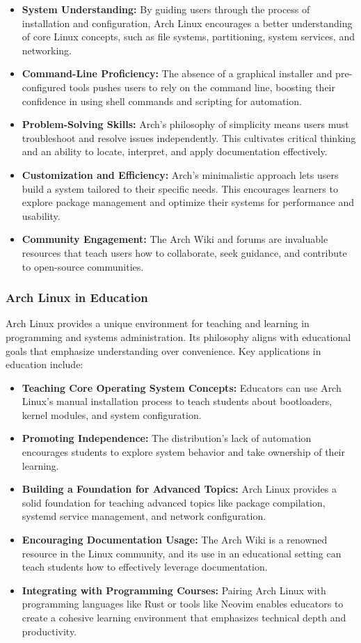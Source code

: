 \documentclass[12pt]{article}
\begin{document}
\begin{itemize}
    \item \textbf{System Understanding:} By guiding users through the process of installation and configuration, Arch Linux encourages a better understanding of core Linux concepts, such as file systems, partitioning, system services, and networking.
    \item \textbf{Command-Line Proficiency:} The absence of a graphical installer and pre-configured tools pushes users to rely on the command line, boosting their confidence in using shell commands and scripting for automation.
    \item \textbf{Problem-Solving Skills:} Arch's philosophy of simplicity means users must troubleshoot and resolve issues independently. This cultivates critical thinking and an ability to locate, interpret, and apply documentation effectively.
    \item \textbf{Customization and Efficiency:} Arch's minimalistic approach lets users build a system tailored to their specific needs. This encourages learners to explore package management and optimize their systems for performance and usability.
    \item \textbf{Community Engagement:} The Arch Wiki and forums are invaluable resources that teach users how to collaborate, seek guidance, and contribute to open-source communities.
\end{itemize}

\subsubsection{Arch Linux in Education}
Arch Linux provides a unique environment for teaching and learning in programming and systems administration. Its philosophy aligns with educational goals that emphasize understanding over convenience. Key applications in education include:  

\begin{itemize}
    \item \textbf{Teaching Core Operating System Concepts:} Educators can use Arch Linux's manual installation process to teach students about bootloaders, kernel modules, and system configuration.  
    \item \textbf{Promoting Independence:} The distribution’s lack of automation encourages students to explore system behavior and take ownership of their learning.  
    \item \textbf{Building a Foundation for Advanced Topics:} Arch Linux provides a solid foundation for teaching advanced topics like package compilation, systemd service management, and network configuration.  
    \item \textbf{Encouraging Documentation Usage:} The Arch Wiki is a renowned resource in the Linux community, and its use in an educational setting can teach students how to effectively leverage documentation.  
    \item \textbf{Integrating with Programming Courses:} Pairing Arch Linux with programming languages like Rust or tools like Neovim enables educators to create a cohesive learning environment that emphasizes technical depth and productivity.
\end{itemize}
\end{document}
